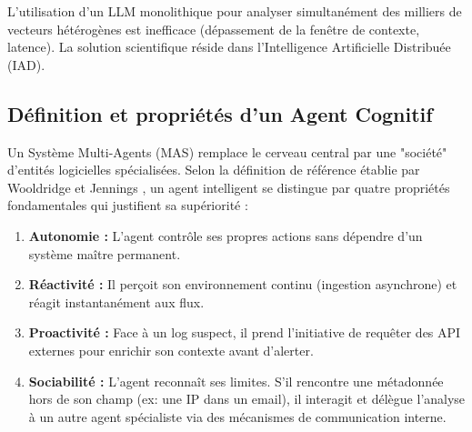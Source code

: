 \documentclass[a4paper, 12pt]{report}
\begin{document}
L'utilisation d'un LLM monolithique pour analyser simultanément des milliers de vecteurs hétérogènes est inefficace (dépassement de la fenêtre de contexte, latence). La solution scientifique réside dans l'Intelligence Artificielle Distribuée (IAD).

\subsection{Définition et propriétés d'un Agent Cognitif}
Un Système Multi-Agents (MAS) remplace le cerveau central par une "société" d'entités logicielles spécialisées. Selon la définition de référence établie par Wooldridge et Jennings \cite{wooldridge_mas}, un agent intelligent se distingue par quatre propriétés fondamentales qui justifient sa supériorité :
\begin{enumerate}
    \item \textbf{Autonomie :} L'agent contrôle ses propres actions sans dépendre d'un système maître permanent.
    \item \textbf{Réactivité :} Il perçoit son environnement continu (ingestion asynchrone) et réagit instantanément aux flux.
    \item \textbf{Proactivité :} Face à un log suspect, il prend l'initiative de requêter des API externes pour enrichir son contexte avant d'alerter.
    \item \textbf{Sociabilité :} L'agent reconnaît ses limites. S'il rencontre une métadonnée hors de son champ (ex: une IP dans un email), il interagit et délègue l'analyse à un autre agent spécialiste via des mécanismes de communication interne.
\end{enumerate}
\end{document}
